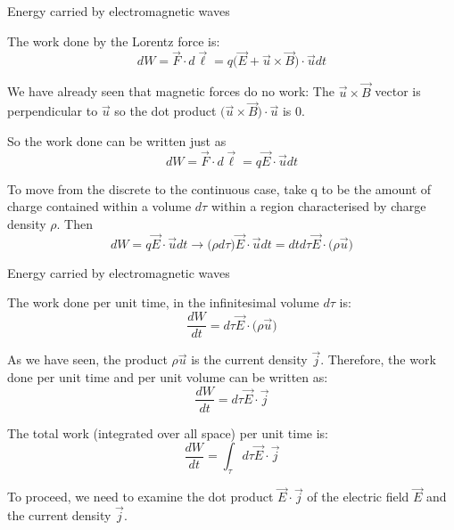 \begin{frame}{Energy carried by electromagnetic waves}

The work done by the Lorentz force is:
\begin{equation*}
  dW = \vec{F} \cdot d\vec{\ell} = q \Big( \vec{E} + \vec{u} \times \vec{B} \Big) \cdot \vec{u} dt
\end{equation*}

We have already seen that magnetic forces do no work:
The $\vec{u} \times \vec{B}$ vector is perpendicular to $\vec{u}$ so the dot product
$\Big( \vec{u} \times \vec{B} \Big) \cdot \vec{u}$ is 0.

So the work done can be written just as
\begin{equation*}
  dW = \vec{F} \cdot d\vec{\ell} = q \vec{E} \cdot \vec{u} dt
\end{equation*}

To move from the discrete to the continuous case, take q to be the amount of charge contained
within a volume $d\tau$ within a region characterised by charge density $\rho$.
Then
\begin{equation*}
  dW = q \vec{E} \cdot \vec{u} dt \rightarrow \Big( \rho d\tau \Big) \vec{E} \cdot \vec{u} dt =
           dt d\tau \vec{E} \cdot \Big( \rho \vec{u} \Big)
\end{equation*}


\end{frame}


%
%
%
%

\begin{frame}{Energy carried by electromagnetic waves}

The work done per unit time, in the infinitesimal volume $d\tau$ is:
\begin{equation*}
  \frac{dW}{dt} =  d\tau \vec{E}  \cdot \Big( \rho \vec{u} \Big)
\end{equation*}

As we have seen, the product $\rho \vec{u}$ is the current density $\vec{j}$. Therefore, the work done per unit time and per unit volume can be written as:
\begin{equation*}
  \frac{dW}{dt} =  d\tau \vec{E}  \cdot \vec{j}
\end{equation*}

The total work (integrated over all space) per unit time is:
\begin{equation*}
  \frac{dW}{dt} =  \int_{\tau} d\tau \vec{E} \cdot \vec{j}
\end{equation*}

To proceed, we need to examine the dot product $\vec{E} \cdot \vec{j}$ of the electric field $\vec{E}$ and the current density $\vec{j}$.

\end{frame}

